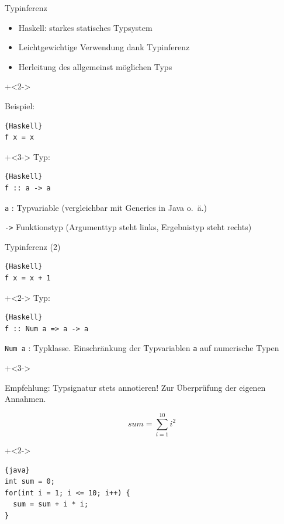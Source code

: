\begin{frame}[fragile]{Typinferenz}
\begin{itemize}
\item Haskell: starkes statisches Typsystem
\item Leichtgewichtige Verwendung dank Typinferenz
\item Herleitung des allgemeinst möglichen Typs
\end{itemize}

\onslide+<2->

Beispiel:
\begin{lstlisting}{Haskell}
f x = x
\end{lstlisting}


\onslide+<3->
Typ: 

\begin{lstlisting}{Haskell}
f :: a -> a
\end{lstlisting}

\texttt{a} : Typvariable  (vergleichbar mit Generics in Java o.~ä.)

\texttt{->} Funktionstyp (Argumenttyp steht links, Ergebnistyp steht rechts)

\end{frame}

\begin{frame}[fragile]{Typinferenz (2)}


\begin{lstlisting}{Haskell}
f x = x + 1
\end{lstlisting}


\onslide+<2->
Typ:

\begin{lstlisting}{Haskell}
f :: Num a => a -> a
\end{lstlisting}

\texttt{Num a} : Typklasse. Einschränkung der Typvariablen \texttt{a} auf numerische Typen

\onslide+<3->
\vfill

Empfehlung: Typsignatur stets annotieren!  Zur Überprüfung der eigenen Annahmen.

\end{frame}

\begin{frame}[fragile]{}

\[
sum = \sum_{i=1}^{10}i^2
\]

\vspace{5em}

\onslide+<2->
\begin{lstlisting}{java}
int sum = 0;
for(int i = 1; i <= 10; i++) {
  sum = sum + i * i;
}
\end{lstlisting}
\end{frame}


